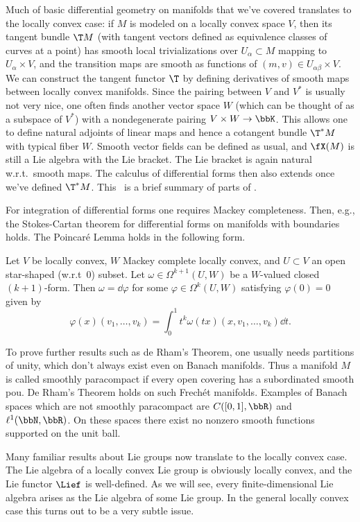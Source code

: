 Much of basic differential geometry on manifolds that we've covered translates to the locally convex case: if $M$ is modeled on a locally convex space $V$, then its tangent bundle $\T M$ (with tangent vectors defined as equivalence classes of curves at a point) has smooth local trivializations over $U_\alpha\subset M$ mapping to $U_\alpha\times V$, and the transition maps are smooth as functions of $(m,v)\in U_{\alpha\beta}\times V$. We can construct the tangent functor $\T$ by defining derivatives of smooth maps between locally convex manifolds. Since the pairing between $V$ and $V^\ast$ is usually not very nice, one often finds another vector space $W$ (which can be thought of as a subspace of $V^\ast$) with a nondegenerate pairing $V\times W\to \bbK$. This allows one to define natural adjoints of linear maps and hence a cotangent bundle $\T^\ast M$ with typical fiber $W$. Smooth vector fields can be defined as usual, and $\fX(M)$ is still a Lie algebra with the Lie bracket. The Lie bracket is again natural w.r.t.\ smooth maps. The calculus of differential forms then also extends once we've defined $\T^\ast M$. This \sect\ is a brief summary of parts of \cite{Neeb}.

For integration of differential forms one requires Mackey completeness. Then, e.g., the Stokes-Cartan theorem for differential forms on manifolds with boundaries holds. The Poincar\'e Lemma holds in the following form.

\begin{lem}
    Let $V$ be locally convex, $W$ Mackey complete locally convex, and $U\subset V$ an open star-shaped (w.r.t\ $0$) subset. Let $\omega\in \Omega^{k+1}(U,W)$ be a $W$-valued closed $(k+1)$-form. Then $\omega=\dd \varphi$ for some $\varphi\in \Omega^k(U,W)$ satisfying $\varphi(0)=0$ given by
    \[\varphi(x)(v_1,\ldots,v_k)=\int_0^1 t^k\omega(tx)(x,v_1,\ldots,v_k)\dd t.\]
\end{lem}

To prove further results such as de Rham's Theorem, one usually needs partitions of unity, which don't always exist even on Banach manifolds. Thus a manifold $M$ is called smoothly paracompact if every open covering has a subordinated smooth \gls{pou}. De Rham's Theorem holds on such Frech\'et manifolds. Examples of Banach spaces which are not smoothly paracompact are $C([0,1],\bbR)$ and $\ell^1(\bbN,\bbR)$. On these spaces there exist no nonzero smooth functions supported on the unit ball.


Many familiar results about Lie groups now translate to the locally convex case. The Lie algebra of a locally convex Lie group is obviously locally convex, and the Lie functor $\Lief$ is well-defined. As we will see, every finite-dimensional Lie algebra arises as the Lie algebra of some Lie group. In the general locally convex case this turns out to be a very subtle issue.

